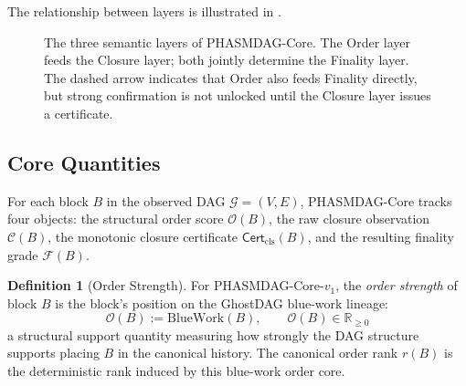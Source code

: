 \documentclass[11pt]{article}
\theoremstyle{definition}
\newtheorem{definition}{Definition}[section]
\theoremstyle{plain}
\theoremstyle{remark}
\newcommand{\Ostr}{\mathcal{O}}          %
\newcommand{\Clvl}{\mathcal{C}}          %
\newcommand{\Ffin}{\mathcal{F}}          %
\newcommand{\Certcls}{\mathsf{Cert}_{\mathrm{cls}}}
\newcommand{\Dag}{\mathcal{G}}          %
\newcommand{\Rset}{\mathbb{R}}          %
\begin{document}
The relationship between layers is illustrated in .

\begin{figure}[t]
\centering
{}
\caption{The three semantic layers of PHASMDAG-Core.  The Order layer feeds the
Closure layer; both jointly determine the Finality layer.  The dashed arrow
indicates that Order also feeds Finality directly, but strong confirmation is
not unlocked until the Closure layer issues a certificate.}
\label{fig:layers}
\end{figure}

\subsection{Core Quantities}

For each block $B$ in the observed DAG $\Dag = (V, E)$,
PHASMDAG-Core tracks four objects:
the structural order score $\Ostr(B)$,
the raw closure observation $\Clvl(B)$,
the monotonic closure certificate $\Certcls(B)$,
and the resulting finality grade $\Ffin(B)$.

\begin{definition}[Order Strength]\label{def:order_strength}
For PHASMDAG-Core-$v_1$, the \emph{order strength} of block $B$ is the block's
position on the GhostDAG blue-work lineage:
\begin{equation}\label{eq:order_strength}
\Ostr(B) := \mathrm{BlueWork}(B), \qquad \Ostr(B) \in \Rset_{\ge 0}
\end{equation}
a structural support quantity measuring how strongly the DAG structure supports
placing $B$ in the canonical history.
The canonical order rank $r(B)$ is the deterministic rank induced by this
blue-work order core.
\end{definition}
\end{document}
